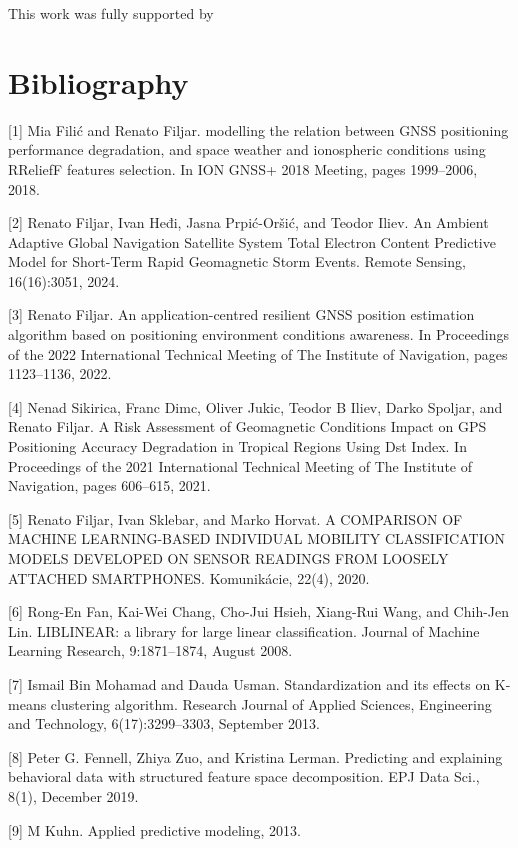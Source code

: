 \documentclass[preprint,12pt]{elsarticle}
\begin{document}
This work was fully supported by

\section{Bibliography}
[1] Mia Filić and Renato Filjar. modelling the relation between GNSS positioning performance degradation, and space weather and ionospheric conditions using RReliefF features selection. In ION GNSS+ 2018 Meeting, pages 1999–2006, 2018. 

[2] Renato Filjar, Ivan Heđi, Jasna Prpić-Oršić, and Teodor Iliev. An Ambient Adaptive Global Navigation Satellite System Total Electron Content Predictive Model for Short-Term Rapid Geomagnetic Storm Events. Remote Sensing, 16(16):3051, 2024. 

[3] Renato Filjar. An application-centred resilient GNSS position estimation algorithm based on positioning environment conditions awareness. In Proceedings of the 2022 International Technical Meeting of The Institute of Navigation, pages 1123–1136, 2022. 

[4] Nenad Sikirica, Franc Dimc, Oliver Jukic, Teodor B Iliev, Darko Spoljar, and Renato Filjar. A Risk Assessment of Geomagnetic Conditions Impact on GPS Positioning Accuracy Degradation in Tropical Regions Using Dst Index. In Proceedings of the 2021 International Technical Meeting of The Institute of Navigation, pages 606–615, 2021. 

[5] Renato Filjar, Ivan Sklebar, and Marko Horvat. A COMPARISON OF MACHINE LEARNING-BASED INDIVIDUAL MOBILITY CLASSIFICATION MODELS DEVELOPED ON SENSOR READINGS FROM LOOSELY ATTACHED SMARTPHONES. Komunikácie, 22(4), 2020. 

[6] Rong-En Fan, Kai-Wei Chang, Cho-Jui Hsieh, Xiang-Rui Wang, and Chih-Jen Lin. LIBLINEAR: a library for large linear classification. Journal of Machine Learning Research, 9:1871–1874, August 2008. 

[7] Ismail Bin Mohamad and Dauda Usman. Standardization and its effects on K-means clustering algorithm. Research Journal of Applied Sciences, Engineering and Technology, 6(17):3299–3303, September 2013. 

[8] Peter G. Fennell, Zhiya Zuo, and Kristina Lerman. Predicting and explaining behavioral data with structured feature space decomposition. EPJ Data Sci., 8(1), December 2019. 

[9] M Kuhn. Applied predictive modeling, 2013. 
\end{document}
